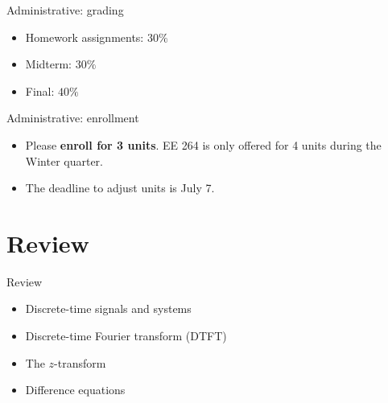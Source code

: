 \documentclass[10pt]{beamer}
\begin{document}
%
\begin{frame}{Administrative: grading}
	
	\begin{itemize}
		\item Homework assignments: $30\%$
		\item Midterm: $30\%$
		\item Final: $40\%$
	\end{itemize}
	
\end{frame}

%
\begin{frame}{Administrative: enrollment}
	
\begin{itemize}
	\item Please \textbf{enroll for 3 units}. EE 264 is only offered for 4 units during the Winter quarter.
	\item The deadline to adjust units is July 7.
\end{itemize}
	
\end{frame}

\section{Review}

%
\begin{frame}{Review}
	\begin{itemize}
		\item Discrete-time signals and systems
		\item Discrete-time Fourier transform (DTFT)
		\item The $z$-transform
		\item Difference equations
	\end{itemize}
\end{frame}
\end{document}
